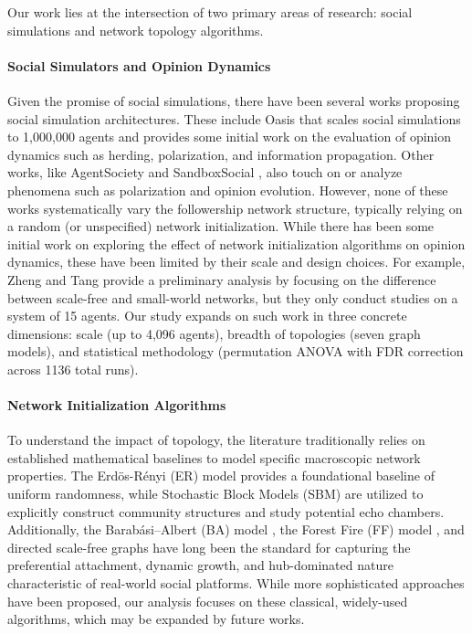 \documentclass[11pt]{article}
\begin{document}
Our work lies at the intersection of two primary areas of research: social simulations and network topology algorithms. 

\paragraph{Social Simulators and Opinion Dynamics} \quad Given the promise of social simulations, there have been several works proposing social simulation architectures. These include Oasis \cite{yang2025oasisopenagentsocial} that scales social simulations to 1,000,000 agents and provides some initial work on the evaluation of opinion dynamics such as herding, polarization, and information propagation. Other works, like AgentSociety \cite{piao2025agentsocietylargescalesimulationllmdriven} and SandboxSocial \cite{touzel2024simulationsolvingsocietalscalemanipulation}, also touch on or analyze phenomena such as polarization and opinion evolution. However, none of these works systematically vary the followership network structure, typically relying on a random (or unspecified) network initialization. While there has been some initial work on exploring the effect of network initialization algorithms on opinion dynamics, these have been limited by their scale and design choices. For example, Zheng and Tang \cite{zheng2026simulatingsocialnetwork} provide a preliminary analysis by focusing on the difference between scale-free and small-world networks, but they only conduct studies on a system of 15 agents. Our study expands on such work in three concrete dimensions: scale (up to 4,096 agents), breadth of topologies (seven graph models), and statistical methodology (permutation ANOVA with FDR correction across 1136 total runs).

\paragraph{Network Initialization Algorithms} \quad To understand the impact of topology, the literature traditionally relies on established mathematical baselines to model specific macroscopic network properties. The Erdös-Rényi (ER) model \cite{erdos1959random} provides a foundational baseline of uniform randomness, while Stochastic Block Models (SBM) \cite{abbe2023communitydetectionstochasticblock} are utilized to explicitly construct community structures and study potential echo chambers. Additionally, the Barabási–Albert (BA) model \cite{albert2002statistical}, the Forest Fire (FF) model \cite{leskovec2005graphs}, and directed scale-free graphs \cite{10.5555/644108.644133} have long been the standard for capturing the preferential attachment, dynamic growth, and hub-dominated nature characteristic of real-world social platforms. While more sophisticated approaches have been proposed, our analysis focuses on these classical, widely-used algorithms, which may be expanded by future works.
\end{document}
